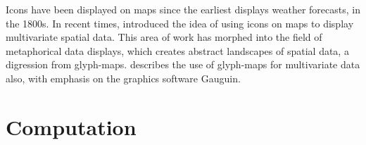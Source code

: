 \documentclass[oneside]{article}
\begin{document}
Icons have been displayed on maps since the earliest displays weather forecasts, in the 1800s. In recent times, \citet{pickett:1988} introduced the idea of using icons on maps to display multivariate spatial data. This area of work has morphed into the field of metaphorical data displays, which creates abstract landscapes of spatial data, a digression from glyph-maps. \citet{gribov:2006} describes the use of glyph-maps for multivariate data also, with emphasis on the graphics software Gauguin. 








\section{Computation}~\label{sec:construction}
\end{document}
